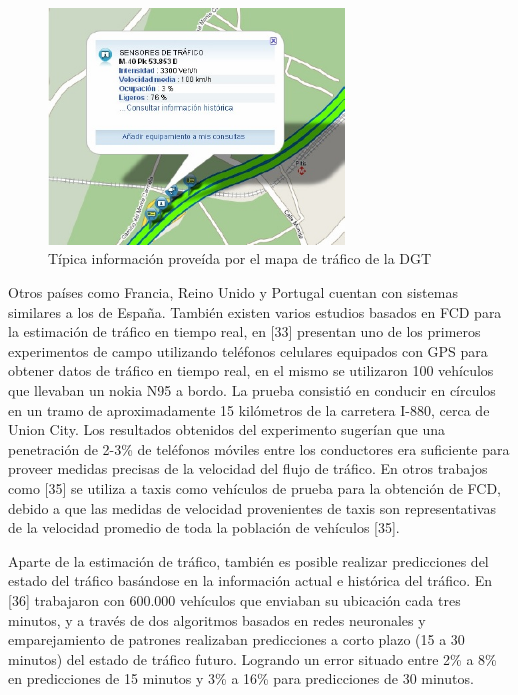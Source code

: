 \begin{figure}[h]
	\centering
	\includegraphics[width=0.7\textwidth]{capitulos/5/figuras/figura2.jpg}
	\caption{\label{fig:mapaTrafico} Típica información proveída por el mapa de tráfico de la DGT}	
\end{figure}

Otros países como Francia, Reino Unido y Portugal cuentan con sistemas similares a los de España. También existen varios estudios basados en FCD para la estimación de tráfico en tiempo real, en [33] presentan uno de los primeros experimentos de campo utilizando teléfonos celulares equipados con GPS para obtener datos de tráfico en tiempo real, en el mismo se utilizaron 100 vehículos que llevaban un nokia N95 a bordo. La prueba consistió en conducir en círculos en un tramo de aproximadamente 15 kilómetros de la carretera I-880, cerca de Union City. Los resultados obtenidos del experimento sugerían que una penetración de 2-3\% de teléfonos móviles entre los conductores era suficiente para proveer medidas precisas de la velocidad del flujo de tráfico. En otros trabajos como [35] se utiliza a taxis como vehículos de prueba para la obtención de FCD, debido a que las medidas de velocidad provenientes de taxis son representativas de la velocidad promedio de toda la población de vehículos [35]. 

Aparte de la estimación de tráfico, también es posible realizar predicciones del estado del tráfico basándose en la información actual e histórica del tráfico. En [36] trabajaron con 600.000 vehículos que enviaban su ubicación cada tres minutos, y a través de dos algoritmos basados en redes neuronales y emparejamiento de patrones realizaban predicciones a corto plazo (15 a 30 minutos) del estado de tráfico futuro. Logrando un error situado entre 2\% a 8\% en predicciones de 15 minutos y 3\% a 16\% para predicciones de 30 minutos.